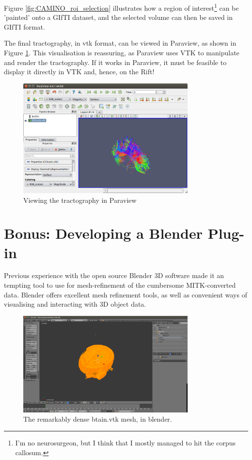 \documentclass[MSc,paper=a4,pagesize=auto]{icldt}
\begin{document}
Figure \ref{fig:CAMINO_roi_selection} illustrates how a region of interest\footnote{I'm no neurosurgeon, but I think that I mostly managed to hit the corpus callosum.} can be 'painted' onto a GIfTI dataset, and the selected volume can then be saved in GIfTI format.

The final tractography, in vtk format, can be viewed in Paraview, as shown in Figure \ref{fig:CAMINO_paraview}. This visualisation is reassuring, as Paraview uses VTK to manipulate and render the tractography. If it works in Paraview, it must be feasible to display it directly in VTK and, hence, on the Rift!

\begin{figure}[htbp!]
    \centering
    \includegraphics[width=0.8\textwidth]{resources/CAMINO_paraview}
    \caption{Viewing the tractography in Paraview}
    \label{fig:CAMINO_paraview}
\end{figure}

\section{Bonus: Developing a Blender Plug-in}
Previous experience with the open source Blender 3D software made it an tempting tool to use for mesh-refinement of the cumbersome MITK-converted data. Blender offers excellent mesh refinement tools, as well as convenient ways of visualising and interacting with 3D object data.

\begin{figure}[htbp!]
    \centering
    \includegraphics[width=0.8\textwidth]{resources/blender_brain}
    \caption{The remarkably dense btain.vtk mesh, in blender.}
    \label{fig:blender_brain}
\end{figure}
\end{document}
